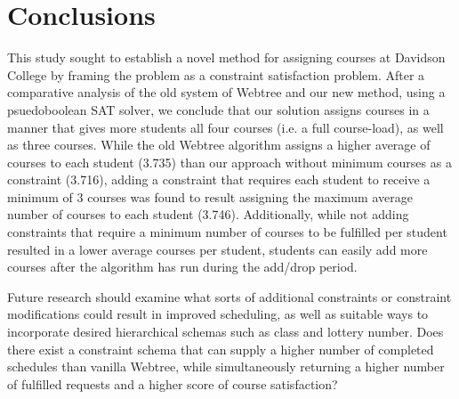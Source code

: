 
\section{Conclusions}
\label{sec:concl}

This study sought to establish a novel method for assigning courses at
Davidson College by framing the problem as a constraint satisfaction
problem. After a comparative analysis of the old system of Webtree and
our new method, using a psuedoboolean SAT solver, we conclude that our
solution assigns courses in a manner that gives more students all four
courses (i.e. a full course-load), as well as three courses. While the
old Webtree algorithm assigns a higher average of courses to each
student (3.735) than our approach without minimum courses as a
constraint (3.716), adding a constraint that requires each student to
receive a minimum of 3 courses was found to result assigning the
maximum average number of courses to each student
(3.746). Additionally, while not adding constraints that require a
minimum number of courses to be fulfilled per student resulted in a
lower average courses per student, students can easily add more
courses after the algorithm has run during the add/drop period. 

Future research should examine what sorts of additional constraints or constraint
modifications could result in improved scheduling, as well as suitable ways to
incorporate desired hierarchical schemas such as class and lottery number. Does
there exist a constraint schema that can supply a higher number of completed
schedules than vanilla Webtree, while simultaneously returning a higher number
of fulfilled requests and a higher score of course satisfaction?